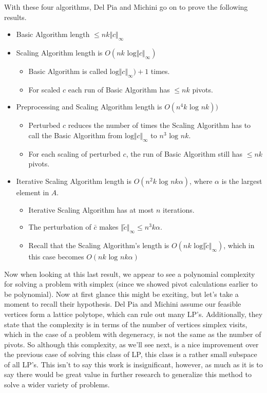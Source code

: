 \documentclass[11pt]{article}
\begin{document}
With these four algorithms, Del Pia and Michini go on to prove the following results.
\begin{itemize}
	\item Basic Algorithm length $\leq nk \Vert c \Vert_\infty$
	\item Scaling Algorithm length is $O(nk \text{ log}\Vert c \Vert_\infty)$
	\begin{itemize}
		\item Basic Algorithm is called $\text{log}\Vert c \Vert_\infty) + 1$ times.
		\item For scaled $c$ each run of Basic Algorithm has $\leq nk$ pivots.
	\end{itemize}
	\item Preprocessing and Scaling Algorithm length is $O(n^4k \text{ log } nk))$
	\begin{itemize}
		\item Perturbed $c$ reduces the number of times the Scaling Algorithm has to call the Basic Algorithm from $\text{log} \Vert c \Vert_\infty$ to $n^3 \text{ log } nk$.
		\item For each scaling of perturbed $c$, the run of Basic Algorithm still has $\leq nk$ pivots.
	\end{itemize}
	\item Iterative Scaling Algorithm length is $O(n^2 k \text{ log } nk\alpha)$, where $\alpha$ is the largest element in $A$.
	\begin{itemize}
		\item Iterative Scaling Algorithm has at most $n$ iterations.
		\item The perturbation of $\bar{c}$ makes $\Vert \tilde{c} \Vert_\infty \leq n^3 k \alpha$.
		\item Recall that the Scaling Algorithm's length is $O(nk \text{ log}\Vert \tilde{c} \Vert_\infty)$, which in this case becomes $O(nk \text{ log } n k \alpha)$
	\end{itemize}
\end{itemize}

Now when looking at this last result, we appear to see a polynomial complexity for solving a problem with simplex (since we showed pivot calculations earlier to be polynomial). Now at first glance this might be exciting, but let's take a moment to recall their hypothesis. Del Pia and Michini assume our feasible vertices form a lattice polytope, which can rule out many LP's. Additionally, they state that the complexity is in terms of the number of vertices simplex visits, which in the case of a problem with degeneracy, is not the same as the number of pivots. So although this complexity, as we'll see next, is a nice improvement over the previous case of solving this class of LP, this class is a rather small subspace of all LP's. This isn't to say this work is insignificant, however, as much as it is to say there would be great value in further research to generalize this method to solve a wider variety of problems.
\end{document}
